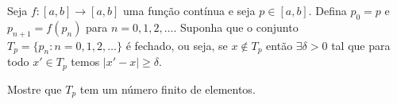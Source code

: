 Seja \(f \colon  [a, b] \to [a, b]\) uma função contínua e seja \(p \in [a, b]\). Defina \(p_0 = p\) e \(p_{n+1} = f(p_n)\) para \(n = 0, 1, 2,\dots\). Suponha que o conjunto \(T_p = \{p_n : n = 0, 1, 2,\dots\}\) é fechado, ou seja, se \(x \not\in T_p\) então \(\exists \delta > 0\) tal que para todo \(x' \in T_p\) temos \(|x'-x|\ge\delta\).

Mostre que \(T_p\) tem um número finito de elementos.
